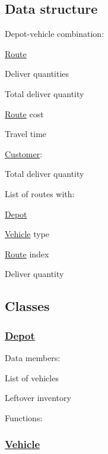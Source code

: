 \subsection*{Data structure}

Depot-\/vehicle combination\+:
\begin{DoxyItemize}
\item \hyperlink{class_route}{Route}
\item Deliver quantities
\item Total deliver quantity
\item \hyperlink{class_route}{Route} cost
\item Travel time
\end{DoxyItemize}

\hyperlink{class_customer}{Customer}\+:
\begin{DoxyItemize}
\item Total deliver quantity
\item List of routes with\+:
\begin{DoxyItemize}
\item \hyperlink{class_depot}{Depot}
\item \hyperlink{class_vehicle}{Vehicle} type
\item \hyperlink{class_route}{Route} index
\item Deliver quantity
\end{DoxyItemize}
\end{DoxyItemize}

\subsection*{Classes}

\subsubsection*{\hyperlink{class_depot}{Depot}}

Data members\+:
\begin{DoxyItemize}
\item List of vehicles
\item Leftover inventory
\end{DoxyItemize}

Functions\+:

\subsubsection*{\hyperlink{class_vehicle}{Vehicle}}

